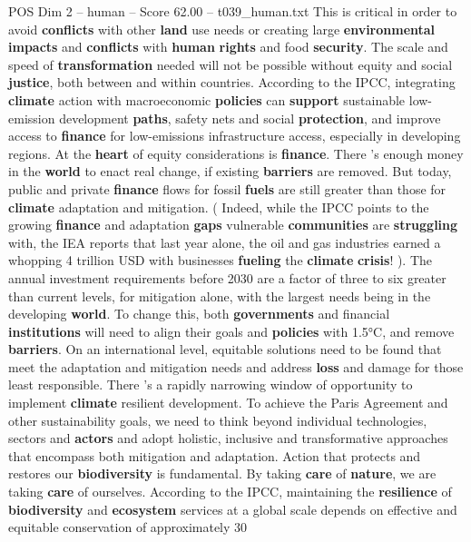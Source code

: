 \begin{textsample}{POS Dim 2 – human – Score 62.00 – t039\_human.txt}
This is critical in order to avoid \textbf{conflicts} with other \textbf{land} use needs or creating large \textbf{environmental} \textbf{impacts} and \textbf{conflicts} with \textbf{human} \textbf{rights} and food \textbf{security}.
The scale and speed of \textbf{transformation} needed will not be possible without equity and social \textbf{justice}, both between and within countries.
According to the IPCC, integrating \textbf{climate} action with macroeconomic \textbf{policies} can \textbf{support} sustainable low-emission development \textbf{paths}, safety nets and social \textbf{protection}, and improve access to \textbf{finance} for low-emissions infrastructure access, especially in developing regions.
At the \textbf{heart} of equity considerations is \textbf{finance}.
There ’s enough money in the \textbf{world} to enact real change, if existing \textbf{barriers} are removed.
But today, public and private \textbf{finance} flows for fossil \textbf{fuels} are still greater than those for \textbf{climate} adaptation and mitigation. ( Indeed, while the IPCC points to the growing \textbf{finance} and adaptation \textbf{gaps} vulnerable \textbf{communities} are \textbf{struggling} with, the IEA reports that last year alone, the oil and gas industries earned a whopping 4 trillion USD with businesses \textbf{fueling} the \textbf{climate} \textbf{crisis}! ).
The annual investment requirements before 2030 are a factor of three to six greater than current levels, for mitigation alone, with the largest needs being in the developing \textbf{world}.
To change this, both \textbf{governments} and financial \textbf{institutions} will need to align their goals and \textbf{policies} with 1.5°C, and remove \textbf{barriers}.
On an international level, equitable solutions need to be found that meet the adaptation and mitigation needs and address \textbf{loss} and damage for those least responsible.
There ’s a rapidly narrowing window of opportunity to implement \textbf{climate} resilient development.
To achieve the Paris Agreement and other sustainability goals, we need to think beyond individual technologies, sectors and \textbf{actors} and adopt holistic, inclusive and transformative approaches that encompass both mitigation and adaptation.
Action that protects and restores our \textbf{biodiversity} is fundamental.
By taking \textbf{care} of \textbf{nature}, we are taking \textbf{care} of ourselves.
According to the IPCC, maintaining the \textbf{resilience} of \textbf{biodiversity} and \textbf{ecosystem} services at a global scale depends on effective and equitable conservation of approximately 30 %

\end{textsample}
